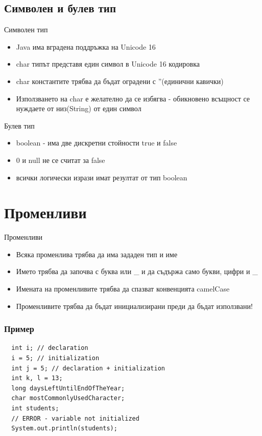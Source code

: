 \documentclass{beamer}
\begin{document}
\subsection{Символен и булев тип}
\begin{frame}{Символен тип}
  \transdissolve
  \begin{itemize}
  \item Java има вградена поддръжка на Unicode 16
  \item char типът представя един символ в Unicode 16 кодировка
  \item char константите трябва да бъдат оградени с ''(единични
    кавички)
  \item Използването на char е желателно да се избягва - обикновено
    всъщност се нуждаете от низ(String) от един символ
  \end{itemize}
\end{frame}

\begin{frame}{Булев тип}
  \transdissolve
  \begin{itemize}
  \item boolean - има две дискретни стойности true и false
  \item 0 и null не се считат за false
  \item всички логически изрази имат резултат от тип boolean
  \end{itemize}
\end{frame}

\section{Променливи}
\begin{frame}{Променливи}
  \transdissolve
  \begin{itemize}
  \item Всяка променлива трябва да има
    зададен тип и име
  \item Името трябва да започва с буква или \_
    и да съдържа само букви, цифри и \_
  \item Имената на променливите трябва да спазват конвенцията camelCase
  \item Променливите трябва да бъдат инициализирани преди да бъдат използвани!
  \end{itemize}
\end{frame}

\begin{frame}[fragile]
  \frametitle{Пример}
  \transdissolve
\begin{lstlisting}
  int i; // declaration
  i = 5; // initialization
  int j = 5; // declaration + initialization
  int k, l = 13;
  long daysLeftUntilEndOfTheYear;
  char mostCommonlyUsedCharacter;
  int students;
  // ERROR - variable not initialized
  System.out.println(students);
\end{lstlisting}
\end{frame}
\end{document}
